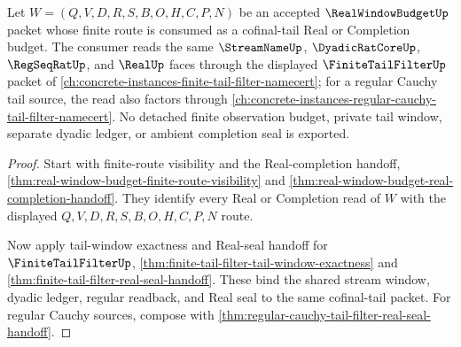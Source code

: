 \begin{theorem}
\label{thm:real-window-budget-finite-tail-filter-handoff}
Let $W=(Q,V,D,R,S,B,O,H,C,P,N)$ be an accepted $\RealWindowBudgetUp$ packet whose
finite route is consumed as a cofinal-tail Real or Completion budget. The
consumer reads the same $\StreamNameUp$, $\DyadicRatCoreUp$, $\RegSeqRatUp$, and
$\RealUp$ faces through the displayed $\FiniteTailFilterUp$ packet of
\autoref{ch:concrete-instances-finite-tail-filter-namecert}; for a regular
Cauchy tail source, the read also factors through
\autoref{ch:concrete-instances-regular-cauchy-tail-filter-namecert}. No detached
finite observation budget, private tail window, separate dyadic ledger, or
ambient completion seal is exported.
\end{theorem}
\begin{proof}
Start with finite-route visibility and the Real-completion handoff,
\autoref{thm:real-window-budget-finite-route-visibility} and
\autoref{thm:real-window-budget-real-completion-handoff}. They identify every Real
or Completion read of $W$ with the displayed $Q,V,D,R,S,B,O,H,C,P,N$ route.

Now apply tail-window exactness and Real-seal handoff for $\FiniteTailFilterUp$,
\autoref{thm:finite-tail-filter-tail-window-exactness} and
\autoref{thm:finite-tail-filter-real-seal-handoff}. These bind the shared stream
window, dyadic ledger, regular readback, and Real seal to the same cofinal-tail
packet. For regular Cauchy sources, compose with
\autoref{thm:regular-cauchy-tail-filter-real-seal-handoff}.
\end{proof}
